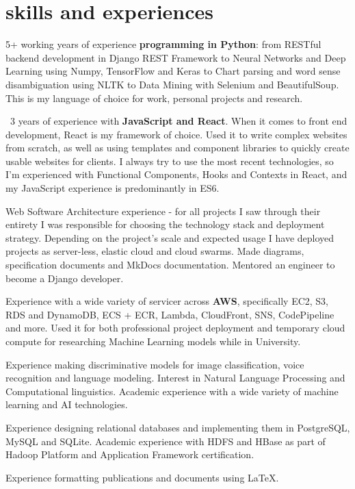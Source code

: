 \documentclass[]{cv-roald}
\begin{document}
\section*{skills and experiences}
\begin{tabitemize}
    \item 5+ working years of experience \textbf{programming in Python}: from RESTful backend development in Django REST Framework to Neural Networks and Deep Learning using Numpy, TensorFlow and Keras to Chart parsing and word sense disambiguation using NLTK to Data Mining with Selenium and BeautifulSoup. This is my language of choice for work, personal projects and research.
    \item ~3 years of experience with \textbf{JavaScript and React}. When it comes to front end development, React is my framework of choice. Used it to write complex websites from scratch, as well as using templates and component libraries to quickly create usable websites for clients. I always try to use the most recent technologies, so I'm experienced with Functional Components, Hooks and Contexts in React, and my JavaScript experience is predominantly in ES6.
    \item Web Software Architecture experience - for all projects I saw through their entirety I was responsible for choosing the technology stack and deployment strategy. Depending on the project's scale and expected usage I have deployed projects as server-less, elastic cloud and cloud swarms. Made diagrams, specification documents and MkDocs documentation. Mentored an engineer to become a Django developer.
    \item Experience with a wide variety of servicer across \textbf{AWS}, specifically EC2, S3, RDS and DynamoDB, ECS + ECR, Lambda, CloudFront, SNS, CodePipeline and more. Used it for both professional project deployment and temporary cloud compute for researching Machine Learning models while in University.
    \item Experience making discriminative models for image classification, voice recognition and language modeling. Interest in Natural Language Processing and Computational linguistics. Academic experience with a wide variety of machine learning and AI technologies.
    \item Experience designing relational databases and implementing them in PostgreSQL, MySQL and SQLite. Academic experience with HDFS and HBase as part of Hadoop Platform and Application Framework certification.
    \item Experience formatting publications and documents using \LaTeX. 

\end{tabitemize}
\end{document}
